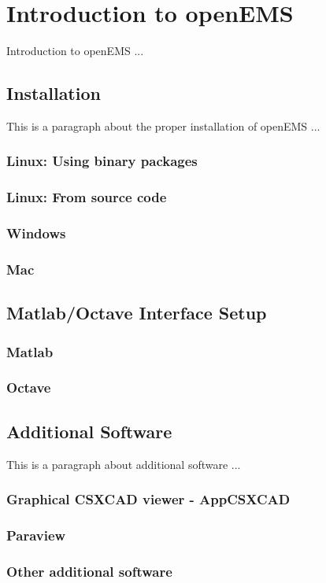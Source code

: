 \chapter{Introduction to openEMS}
Introduction to openEMS ...

\section{Installation}
This is a paragraph about the proper installation of openEMS ...

\subsection{Linux: Using binary packages}

\subsection{Linux: From source code}

\subsection{Windows}

\subsection{Mac}

\section{Matlab/Octave Interface Setup}

\subsection{Matlab}

\subsection{Octave}


\section{Additional Software}
This is a paragraph about additional software ... 

\subsection{Graphical CSXCAD viewer - AppCSXCAD}

\subsection{Paraview}

\subsection{Other additional software}